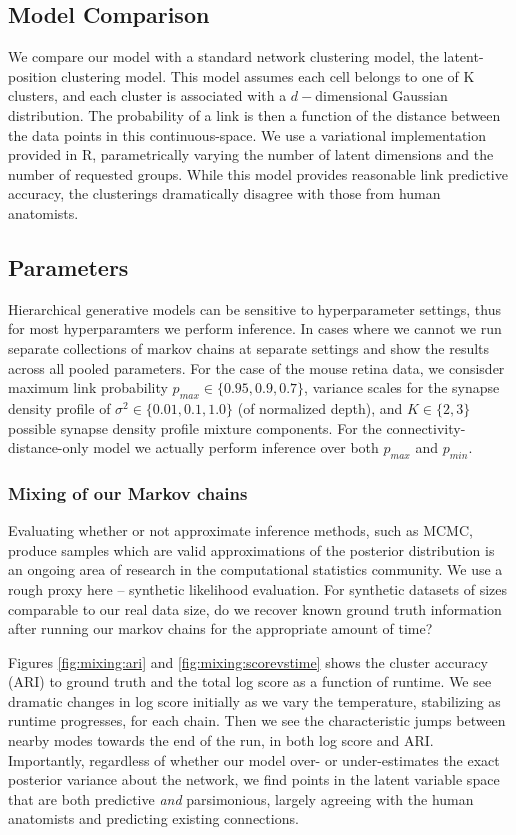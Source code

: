 \documentclass{article}
\begin{document}
{\subsection*{Model Comparison}
We compare our model with a standard network clustering model, the
latent-position clustering model. This model assumes each cell belongs
to one of K clusters, and each cluster is associated with a
$d-$dimensional Gaussian distribution. The probability of a link is
then a function of the distance between the data points in this
continuous-space. We use \autocite{Salter-Townshend2013} a variational
implementation provided in R, parametrically varying the number of
latent dimensions and the number of requested groups.  While this
model provides reasonable link predictive accuracy, the clusterings
dramatically disagree with those from human anatomists.


\subsection*{Parameters}

Hierarchical generative models can be sensitive to hyperparameter
settings, thus for most hyperparamters we perform inference. In cases
where we cannot we run separate collections of markov chains at
separate settings and show the results across all pooled
parameters. For the case of the mouse retina data, we consisder
maximum link probability $p_{max} \in \{0.95, 0.9, 0.7\}$, variance
scales for the synapse density profile of $\sigma^2 \in \{0.01, 0.1,
1.0\}$ (of normalized depth), and $K \in \{2, 3\}$ possible synapse
density profile mixture components. For the connectivity-distance-only
model we actually perform inference over both $p_{max}$ and $p_{min}$.


\subsubsection*{Mixing of our Markov chains} 
Evaluating whether or not approximate inference methods, such as MCMC,
produce samples which are valid approximations of the posterior
distribution is an ongoing area of research in the computational
statistics community. We use a rough proxy here -- synthetic
likelihood evaluation.  For synthetic datasets of sizes comparable to
our real data size, do we recover known ground truth information after
running our markov chains for the appropriate amount of time?

Figures \ref{fig:mixing:ari} and \ref{fig:mixing:scorevstime} shows
the cluster accuracy (ARI) to ground truth and the total log score as a function of
runtime.  We see dramatic changes in log score initially as we vary
the temperature, stabilizing as runtime progresses, for each
chain. Then we see the characteristic jumps between nearby modes
towards the end of the run, in both log score and ARI.  Importantly,
regardless of whether our model over- or under-estimates the exact
posterior variance about the network, we find points in the latent
variable space that are both predictive \textit{and} parsimonious,
largely agreeing with the human anatomists and predicting existing
connections.

}
\end{document}
